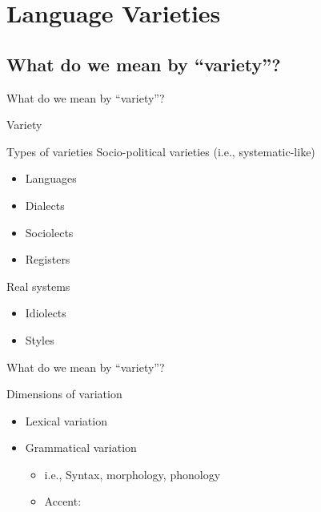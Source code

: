 \documentclass{beamer}
\newcommand{\subtwoone}{What do we mean by ``variety''?}
\begin{document}
  \section{Language Varieties}
    \subsection{\subtwoone}
      \begin{frame}{\subtwoone}
        \begin{alertblock}{Variety}
          
        \end{alertblock}
        \begin{block}{Types of varieties}
          Socio-political varieties (i.e., systematic-like)
          \begin{itemize}
            \item Languages %
            \item Dialects %
            \item Sociolects %
            \item Registers %
          \end{itemize}
          Real systems
          \begin{itemize}
            \item Idiolects
            \item Styles
          \end{itemize}
        \end{block}
      \end{frame}

      \begin{frame}{\subtwoone}
        \begin{block}{Dimensions of variation}
          \begin{itemize}
            \item Lexical variation
            \item Grammatical variation
            \begin{itemize}
              \item i.e., Syntax, morphology, phonology
              \item \alert{Accent}: 
            \end{itemize}
          \end{itemize}
        \end{block}
      \end{frame}
\end{document}
